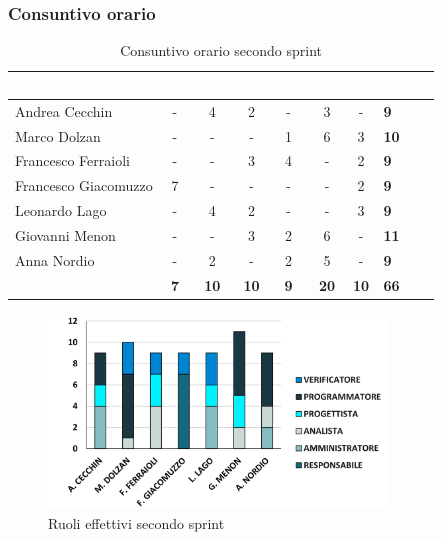 \subsubsection{Consuntivo orario}
{
\setlength{\tabcolsep}{10pt}
\renewcommand{\arraystretch}{1.5}
\begin{table}[h!]
    \centering
    \begin{tabularx}{\textwidth}{| l | c | c | c | c | c | c | X |}
        \hline
        \rowcolor{headerrow} \textbf{\textcolor{white}{Membro}} & \textbf{\textcolor{white}{R.}} & \textbf{\textcolor{white}{Am.}} & \textbf{\textcolor{white}{Pj.}} & \textbf{\textcolor{white}{An.}} & \textbf{\textcolor{white}{Pg.}} & \textbf{\textcolor{white}{V.}} & \textbf{\textcolor{white}{Totale}} \\
        \hline
        Andrea Cecchin & - & 4 & 2 & - & 3 & - & \textbf{9} \\
        \hline
        Marco Dolzan & - & - & - & 1 & 6 & 3 & \textbf{10} \\
        \hline
        Francesco Ferraioli & - & - & 3 & 4 & - & 2 & \textbf{9} \\
        \hline  
        Francesco Giacomuzzo & 7 & - & - & - & - & 2 & \textbf{9} \\
        \hline
        Leonardo Lago & - & 4 & 2 & - & - & 3 & \textbf{9} \\
        \hline
        Giovanni Menon & - & - & 3 & 2 & 6 & - & \textbf{11} \\
        \hline
        Anna Nordio & - & 2 & - & 2 & 5 & - & \textbf{9} \\
        \hline
    \cellcolor{headerrow} \textbf{\textcolor{white}{Totale}} & \textbf{7} & \textbf{10} & \textbf{10} & \textbf{9} & \textbf{20} & \textbf{10} & \textbf{66} \\
        \hline
    \end{tabularx} 
    \caption{Consuntivo orario secondo sprint}
    \label{tab:consuntivoorariosecondosprint}
\end{table}
}

\begin{figure}[h!]
    \centering
    \includegraphics[width=0.8\textwidth]{cons2ruoli.png}
    \caption{Ruoli effettivi secondo sprint}
    \label{fig:consuntivoorariosecondosprint}
\end{figure}

